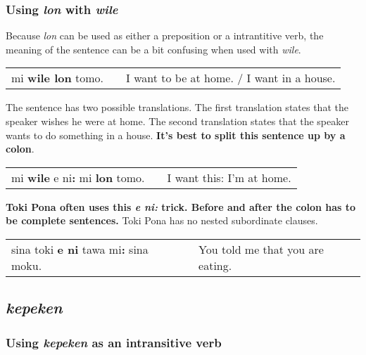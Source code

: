 \subsubsection*{Using \textit{lon} with \textit{wile}}
%
Because \textit{lon} can be used as either a preposition or a intrantitive verb, the meaning of the sentence can be a bit confusing when used with \textit{wile}. 

\begin{supertabular}{p{5,5cm}|ll}
mi \textbf{wile lon} tomo. && I want to be at home. / I want in a house. \\
\end{supertabular} 

The sentence has two possible translations. 
The first translation states that the speaker wishes he were at home. 
The second translation states that the speaker wants to do something in a house. 
\textbf{It's best to split this sentence up by a colon}.

\begin{supertabular}{p{5,5cm}|ll}
mi \textbf{wile} e ni\textbf{:} mi \textbf{lon} tomo. && I want this: I'm at home. \\
\end{supertabular} 

\textbf{Toki Pona often uses this \textit{e ni:} trick. 
Before and after the colon has to be complete sentences. }
Toki Pona has no nested subordinate clauses.

\begin{supertabular}{p{5,5cm}|ll}
sina toki \textbf{e ni} tawa mi\textbf{:} sina moku. && You told me that you are eating. \\
\end{supertabular} 

{}
\subsection*{\textit{kepeken}}
%
\subsubsection*{Using \textit{kepeken} as an intransitive verb}

